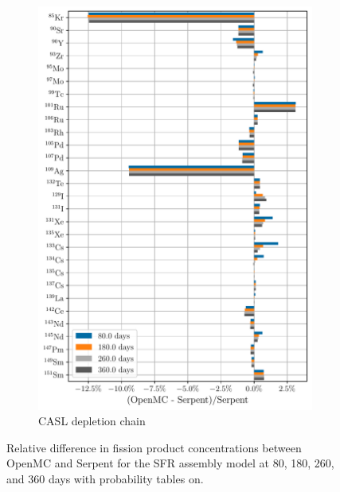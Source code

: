 \documentclass[3p,authoryear]{elsarticle}
\begin{document}
\begin{figure}[H]
  \hspace{0.05\textwidth}
  \begin{subfigure}[t]{0.45\textwidth}
    \includegraphics[width=\textwidth]{figures/sfr_fp_casl_average.pdf}
    \caption{CASL depletion chain}
  \end{subfigure}
  \caption{Relative difference in fission product concentrations between OpenMC
  and Serpent for the SFR assembly model at 80, 180, 260, and 360 days with
  probability tables on.}
  \label{fig:sfr-fp}
\end{figure}
\end{document}
